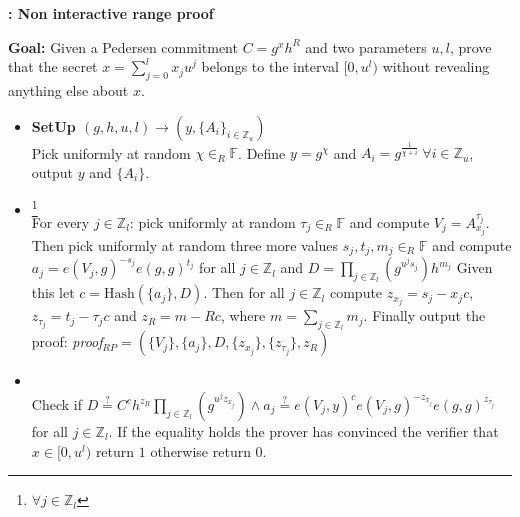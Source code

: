 \begin{algorithm}[]
\caption{\textbf{: Non interactive range proof}}
\textbf{Goal:} Given a Pedersen commitment $C=g^x h^R$ and two parameters $u,l$, prove that the secret $x=\sum_{j=0}^l x_j u^j$ belongs to the interval $[0,u^l)$ without revealing anything else about $x$.
\vspace{2pt}
\hline
\vspace{2pt}
\begin{itemize}
  \item\textbf{SetUp $(g,h,u,l)\xrightarrow[]{}(y,\{A_{i}\}_{i\in\mathds{Z}_u})$}\\
Pick uniformly at random $\chi\in_R\mathds{F}$. Define $y=g^\chi$ and $A_i=g^{\frac{1}{\chi+i}} \: \forall i\in\mathds{Z}_u$, output $y$ and $\{A_i\}$.

\item{}\footnote{$\forall j\in\mathds{Z}_l$}\\
 For every $j\in\mathds{Z}_l$: pick uniformly at random $\tau_j\in_R\mathds{F}$ and compute $V_j=A_{x_j}^{\tau_j}$. Then pick uniformly at random three more values $s_j,t_j,m_j\in_R\mathds{F}$ and compute $a_j=e(V_j,g)^{-s_j}e(g,g)^{t_j}$ for all $j\in\mathds{Z}_l$ and $D=\prod_{j\in\mathds{Z}_l}(g^{u^js_j})h^{m_j}$ Given this let $c=\text{Hash}(\{a_j\},D)$. Then for all $j\in\mathds{Z}_l$ compute $z_{x_j}=s_j-x_jc$,$z_{\tau_j}=t_j-\tau_jc$ and $z_R=m-Rc$, where $m=\sum_{j\in\mathds{Z}_l}m_j$. Finally output the proof: \textit{proof}$_{RP}=(\{V_j\},\{a_j\},D,\{z_{x_j}\},\{z_{\tau_j}\},z_R)$ 

\item{}\\
Check if $D\overset{?}{=}C^ch^{z_R}\prod_{j\in\mathds{Z}_l}(g^{u^j z_{x_j}})\wedge a_j \overset{?}{=} e(V_j,y)^c e(V_j,g)^{-z_{x_j}}e(g,g)^{z_{\tau_j}}$ for all $j\in\mathds{Z}_l$.  If the equality holds the prover has convinced the verifier that $x\in [0,u^l)$ return $1$ otherwise return $0$.
\end{itemize}
\label{alg:ZKRP}
\end{algorithm}

